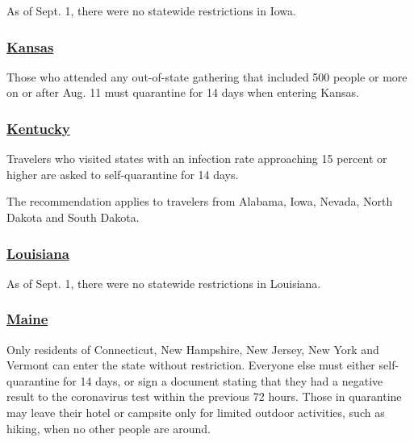 As of Sept. 1, there were no statewide restrictions in Iowa.

\hypertarget{kansas}{%
\subsubsection{\texorpdfstring{\href{https://www.coronavirus.kdheks.gov/175/Travel-Exposure-Related-Isolation-Quaran}{Kansas}}{Kansas}}\label{kansas}}

Those who attended any out-of-state gathering that included 500 people
or more on or after Aug. 11 must quarantine for 14 days when entering
Kansas.

\hypertarget{kentucky}{%
\subsubsection{\texorpdfstring{\href{https://govstatus.egov.com/kycovid19}{Kentucky}}{Kentucky}}\label{kentucky}}

Travelers who visited states with an infection rate approaching 15
percent or higher are asked to self-quarantine for 14 days.

The recommendation applies to travelers from Alabama, Iowa, Nevada,
North Dakota and South Dakota.

\hypertarget{louisiana}{%
\subsubsection{\texorpdfstring{\href{https://louisianatravelassociation.org/covid-19-resources}{Louisiana}}{Louisiana}}\label{louisiana}}

As of Sept. 1, there were no statewide restrictions in Louisiana.

\hypertarget{maine}{%
\subsubsection{\texorpdfstring{\href{https://www.maine.gov/covid19/restartingmaine/keepmainehealthy/faqs}{Maine}}{Maine}}\label{maine}}

Only residents of Connecticut, New Hampshire, New Jersey, New York and
Vermont can enter the state without restriction. Everyone else must
either self-quarantine for 14 days, or sign a document stating that they
had a negative result to the coronavirus test within the previous 72
hours. Those in quarantine may leave their hotel or campsite only for
limited outdoor activities, such as hiking, when no other people are
around.

